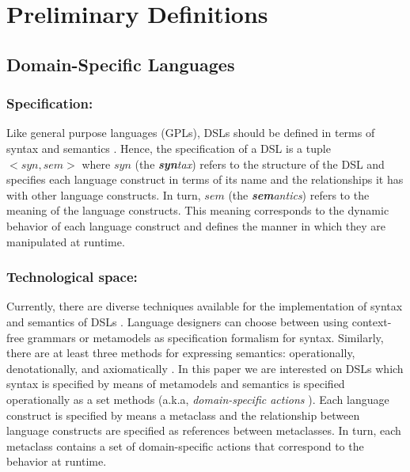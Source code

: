 \section{Preliminary Definitions}
\label{sec:background}

\subsection{Domain-Specific Languages}


\subsubsection{Specification:} Like general purpose languages (GPLs), DSLs should be defined in terms of syntax and semantics \cite{Harel:2004b}. Hence, the specification of a DSL is a tuple $<syn,sem>$ where $syn$ (the \textit{\textbf{syn}tax}) refers to the structure of the DSL and specifies each language construct in terms of its name and the relationships it has with other language constructs. In turn, $sem$ (the \textit{\textbf{sem}antics}) refers to the meaning of the language constructs. This meaning corresponds to the dynamic behavior of each language construct and defines the manner in which they are manipulated at runtime.

\vspace{-3mm}
\subsubsection{Technological space:} Currently, there are diverse techniques available for the implementation of syntax and semantics of DSLs \cite{Mernik:2005b}. Language designers can choose between using context-free grammars or metamodels as specification formalism for syntax. Similarly, there are at least three methods for expressing semantics: operationally, denotationally, and axiomatically \cite{Mosses:2001}. In this paper we are interested on DSLs which syntax is specified by means of metamodels and semantics is specified operationally as a set methods (a.k.a, \textit{domain-specific actions} \cite{Combemale:2013}). Each language construct is specified by means a metaclass and the relationship between language constructs are specified as references between metaclasses. In turn, each metaclass contains a set of domain-specific actions that correspond to the behavior at runtime.


